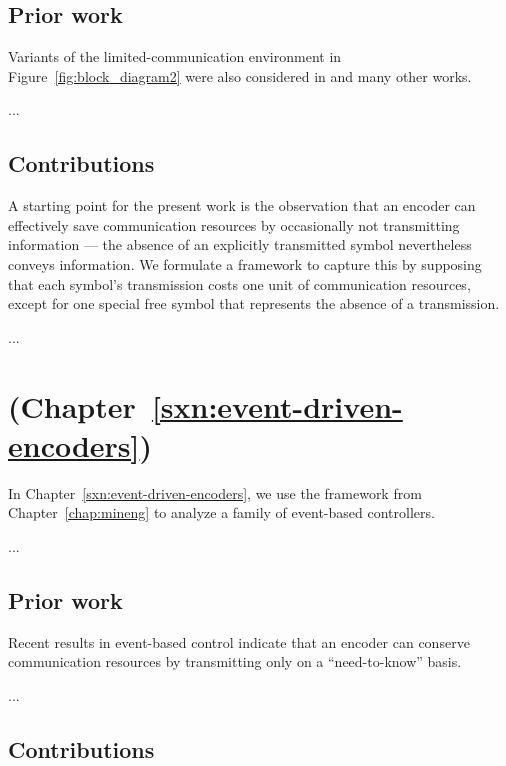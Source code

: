\subsection*{Prior work}

Variants of the limited-communication environment in Figure~\ref{fig:block_diagram2} were also considered in \cite{BrockettLiberzon2000,HespanhaOrtegaVasudevanAug02,NairEvans2000,TatikondaMitter2004,NairEvans2003,MatveevSavkin2005} and many other works. 

...


\subsection*{Contributions}

A starting point for the present work is the observation that an encoder can
effectively save communication resources by occasionally not
transmitting information --- the absence of an explicitly transmitted
symbol nevertheless conveys information. We formulate a framework to
capture this by supposing that each symbol's transmission costs one
unit of communication resources, except for one special free symbol that
represents the absence of a transmission.

...

\section*{ (Chapter~\ref{sxn:event-driven-encoders})}

In Chapter~\ref{sxn:event-driven-encoders}, we use the framework from Chapter~\ref{chap:mineng} to analyze a family of event-based controllers.

...


\subsection*{Prior work}

Recent results in event-based
control
\cite{AstromBernhardsson2002,Astrom2007,Lunze2010211,TabuadaSep2007}
indicate that an encoder can conserve communication resources by
transmitting only on a ``need-to-know'' basis. 

...


\subsection*{Contributions}

